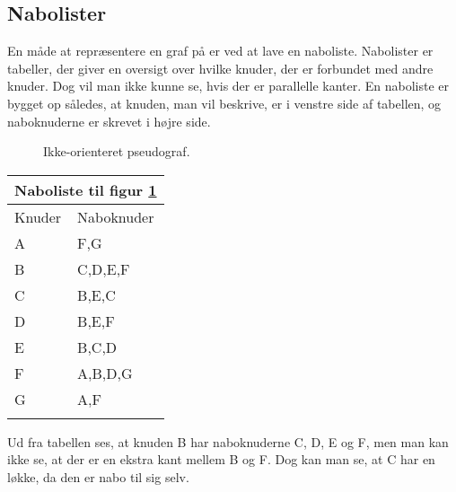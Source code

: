 \subsection{Nabolister}
En måde at repræsentere en graf på er ved at lave en naboliste. Nabolister er tabeller, der giver en oversigt over hvilke knuder, der er forbundet med andre knuder. Dog vil man ikke kunne se, hvis der er parallelle kanter. En naboliste er bygget op således, at knuden, man vil beskrive, er i venstre side af tabellen, og naboknuderne er skrevet i højre side. \\

\begin{figure}[h]
  \centering
  \caption{Ikke-orienteret pseudograf.}
  \label{fig:ikke-orienteret-pseudo}
\end{figure}

\begin{center}
	\begin{tabular}{ |p{4cm}||p{3cm}|}
	 	\hline
 		\multicolumn{2}{|c|}{Naboliste til figur \ref{fig:ikke-orienteret-pseudo}} \\
 		\hline
 		Knuder & Naboknuder\\
 		\hline
 		A & F,G \\
		B & C,D,E,F \\
		C & B,E,C \\
		D & B,E,F \\
		E & B,C,D \\
		F & A,B,D,G \\
		G & A,F \\
 	\hline
 	\label{tab:naboliste} 	
	\end{tabular}
\end{center}
Ud fra tabellen ses, at knuden B har naboknuderne C, D, E og F, men man kan ikke se, at der er en ekstra kant mellem B og F. Dog kan man se, at C har en løkke, da den er nabo til sig selv.

